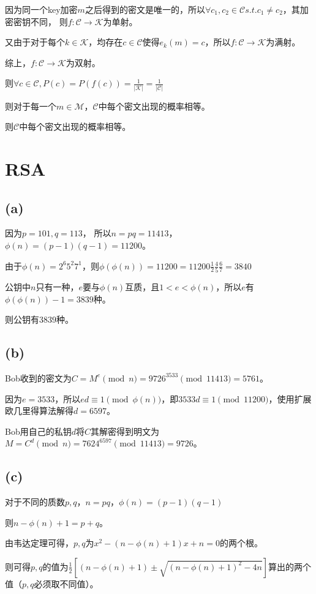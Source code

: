 \documentclass[twoside,11pt]{article}
\begin{document}
因为同一个key加密$m$之后得到的密文是唯一的，所以$\forall c_1, c_2 \in \mathcal{C} s.t. c_1 \ne c_2$，其加密密钥不同，
则$f: \mathcal{C} \to \mathcal{K}$为单射。

又由于对于每个$k \in \mathcal{K}$，均存在$c \in \mathcal{C}$使得$e_k(m) = c$，所以$f: \mathcal{C} \to \mathcal{K}$为满射。

综上，$f: \mathcal{C} \to \mathcal{K}$为双射。

则$\forall c \in \mathcal{C}, P(c)=P(f(c))=\frac{1}{|\mathcal{K}|}=\frac{1}{|\mathcal{C}|}$

则对于每一个$m \in \mathcal{M}$，$\mathcal{C}$中每个密文出现的概率相等。

则$\mathcal{C}$中每个密文出现的概率相等。


\section{RSA}
\subsection*{(a)}
因为$p=101,q=113$，
所以$n=pq=11413$，$\phi(n)=(p-1)(q-1)=11200$。

由于$\phi(n)=2^6 5^2 7^1$，则$\phi(\phi(n))=11200=11200 \frac{1}{2} \frac{4}{5} \frac{6}{7} = 3840$

公钥中$n$只有一种，$e$要与$\phi(n)$互质，且$1<e<\phi(n)$，所以$e$有$\phi(\phi(n))-1=3839$种。

则公钥有$3839$种。

\subsection*{(b)}
Bob收到的密文为$C = M^e \pmod{n} = 9726^{3533} \pmod{11413} = 5761$。

因为$e=3533$，所以$ed \equiv 1 \pmod{\phi(n)}$，即$3533d \equiv 1 \pmod{11200}$，使用扩展欧几里得算法解得$d=6597$。

Bob用自己的私钥$d$将$C$其解密得到明文为$M = C^d \pmod{n} = 7624^{6597} \pmod{11413} = 9726$。

\subsection*{(c)}
对于不同的质数$p,q$，$n=pq$，$\phi(n)=(p-1)(q-1)$

则$n-\phi(n)+1=p+q$。

由韦达定理可得，$p,q$为$x^2 - (n-\phi(n)+1)x + n =0$的两个根。

则可得$p, q$的值为$\frac{1}{2} [(n-\phi(n)+1) \pm \sqrt{(n-\phi(n)+1)^2 - 4n}]$算出的两个值（$p,q$必须取不同值）。
\end{document}
